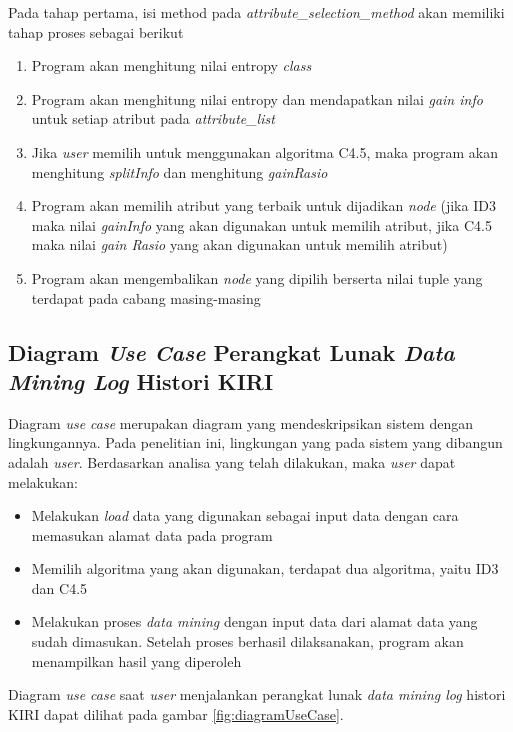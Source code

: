 Pada tahap pertama, isi method pada \textsl{attribute\_selection\_method} akan memiliki tahap proses sebagai berikut
\begin{enumerate}
	\item Program akan menghitung nilai entropy \textsl{class}
	\item Program akan menghitung nilai entropy dan mendapatkan nilai \textsl{gain info} untuk setiap atribut pada \textsl{attribute\_list}
	\item Jika \textsl{user} memilih untuk menggunakan algoritma C4.5, maka program akan menghitung \textsl{splitInfo} dan menghitung \textsl{gainRasio}
	\item Program akan memilih atribut yang terbaik untuk dijadikan \textsl{node} (jika ID3 maka nilai \textsl{gainInfo} yang akan digunakan untuk memilih atribut, jika C4.5 maka nilai \textsl{gain Rasio} yang akan digunakan untuk memilih atribut)
	\item Program akan mengembalikan \textsl{node} yang dipilih berserta nilai tuple yang terdapat pada cabang masing-masing
\end{enumerate}

\subsection{Diagram \textsl{Use Case} Perangkat Lunak \textsl{Data Mining Log} Histori KIRI}

Diagram \textsl{use case} merupakan diagram yang mendeskripsikan sistem dengan lingkungannya. Pada penelitian ini, lingkungan yang pada sistem yang dibangun adalah \textsl{user}. Berdasarkan analisa yang telah dilakukan, maka \textsl{user} dapat melakukan:
\begin{itemize}
	\item Melakukan \textsl{load} data yang digunakan sebagai input data dengan cara memasukan alamat data pada program
	\item Memilih algoritma yang akan digunakan, terdapat dua algoritma, yaitu ID3 dan C4.5
	\item Melakukan proses \textsl{data mining} dengan input data dari alamat data yang sudah dimasukan. Setelah proses berhasil dilaksanakan, program akan menampilkan hasil yang diperoleh
\end{itemize}

Diagram \textsl{use case} saat \textsl{user} menjalankan perangkat lunak \textsl{data mining log} histori KIRI dapat dilihat pada gambar \ref{fig:diagramUseCase}.

